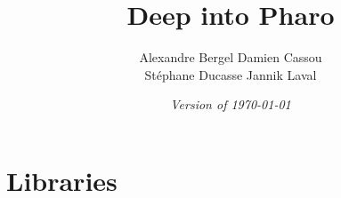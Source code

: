 \documentclass[a4paper,10pt,twoside]{book}
\begin{document}
\frontmatter
\setcounter{page}{1}
\pagestyle{headings}
\author{
	Alexandre Bergel\quad 
	Damien Cassou\quad \\
	St\'ephane Ducasse\quad 
	Jannik Laval
	}
\title{\Huge\bf Deep into Pharo}
\isodate
\date{\emph{Version of \today}}
\maketitle




\tableofcontents
\sloppy %
\mainmatter






\part{Libraries}



 


\end{document}
